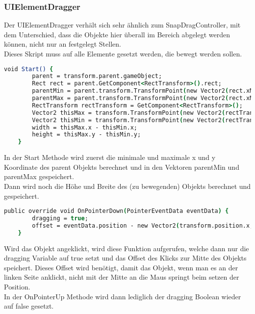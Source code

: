 {\subsubsection{UIElementDragger}
Der UIElementDragger verhält sich sehr ähnlich zum SnapDragController, mit dem Unterschied, dass die Objekte hier überall im Bereich abgelegt werden können, nicht nur an festgelegt Stellen.\\
Dieses Skript muss auf alle Elemente gesetzt werden, die bewegt werden sollen.\\
\begin{lstlisting}[language=csh, caption={Berechnen der Breite des beweglichen Objekts und des Bereichs in dem es bewegt wird}]
void Start() {
        parent = transform.parent.gameObject;
        Rect rect = parent.GetComponent<RectTransform>().rect;
        parentMin = parent.transform.TransformPoint(new Vector2(rect.xMin, rect.yMin));
        parentMax = parent.transform.TransformPoint(new Vector2(rect.xMax, rect.yMax));
        RectTransform rectTransform = GetComponent<RectTransform>();
        Vector2 thisMax = transform.TransformPoint(new Vector2(rectTransform.rect.xMax, rectTransform.rect.yMax));
        Vector2 thisMin = transform.TransformPoint(new Vector2(rectTransform.rect.xMin, rectTransform.rect.yMin));
        width = thisMax.x - thisMin.x;
        height = thisMax.y - thisMin.y;
    }
\end{lstlisting}
In der Start Methode wird zuerst die minimale und maximale x und y Koordinate des parent Objekts berechnet und in den Vektoren parentMin und parentMax gespeichert.\\
Dann wird noch die Höhe und Breite des (zu bewegenden) Objekts berechnet und gespeichert.\\
\begin{lstlisting}[language=csh, caption={OnPointerDown Methode des UIElementDraggers}]
public override void OnPointerDown(PointerEventData eventData) {
        dragging = true;
        offset = eventData.position - new Vector2(transform.position.x, transform.position.y);
    }
\end{lstlisting}
Wird das Objekt angeklickt, wird diese Funktion aufgerufen, welche dann nur die dragging Variable auf true setzt und das Offset des Klicks zur Mitte des Objekts speichert. Dieses Offset wird benötigt, damit das Objekt, wenn man es an der linken Seite anklickt, nicht mit der Mitte an die Maus springt beim setzen der Position.\\
In der OnPointerUp Methode wird dann lediglich der dragging Boolean wieder auf false gesetzt.\\

}
